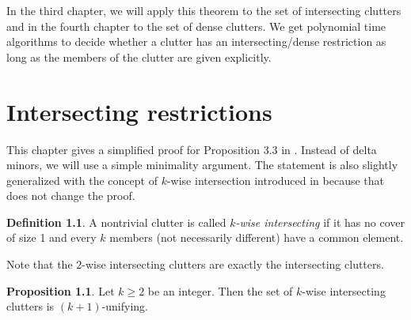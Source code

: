 \documentclass[a4paper, 12pt]{scrbook}
\theoremstyle{definition}
\newtheorem*{definition}{Definition}
\newtheorem{proposition}[theorem]{Proposition}
\begin{document}
   In the third chapter, we will apply this theorem to the set of intersecting clutters and in the fourth chapter to the set of dense clutters.
   We get polynomial time algorithms to decide whether a clutter has an intersecting/dense restriction as long as the members of the clutter are given explicitly.

   \chapter{Intersecting restrictions}
   This chapter gives a simplified proof for Proposition 3.3 in \cite{restrictions}.
   Instead of delta minors, we will use a simple minimality argument.
   The statement is also slightly generalized with the concept of $k$-wise intersection introduced in \cite{k-wise} because that does not change the proof.
   \begin{definition}
       A nontrivial clutter is called \emph{$k$-wise intersecting} if it has no cover of size 1 and every $k$ members (not necessarily different) have a common element.
   \end{definition}

   Note that the $2$-wise intersecting clutters are exactly the intersecting clutters.
   \begin{proposition}
       Let $k\geq 2$ be an integer.
       Then the set of $k$-wise intersecting clutters is $(k+1)$-unifying.
   \end{proposition}
\end{document}
